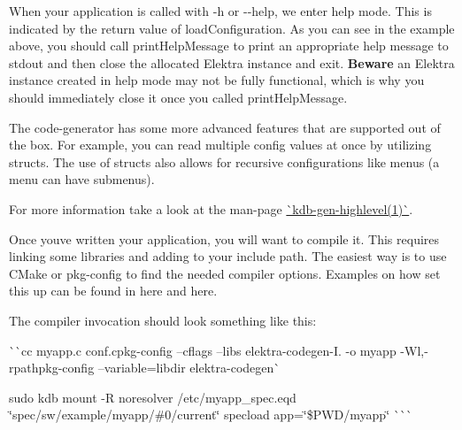 When your application is called with {\ttfamily -\/h} or {\ttfamily -\/-\/help}, we enter help mode. This is indicated by the return value {} of {\ttfamily load\+Configuration}. As you can see in the example above, you should call {\ttfamily print\+Help\+Message} to print an appropriate help message to {\ttfamily stdout} and then close the allocated {\ttfamily Elektra} instance and {\ttfamily exit}. {\bfseries{Beware}} an {\ttfamily Elektra} instance created in help mode may not be fully functional, which is why you should immediately close it once you called {\ttfamily print\+Help\+Message}.

The code-\/generator has some more advanced features that are supported out of the box. For example, you can read multiple config values at once by utilizing structs. The use of structs also allows for recursive configurations like menus (a menu can have submenus).

For more information take a look at the man-\/page \mbox{\hyperlink{doc_help_kdb-gen-highlevel_md}{\`{}kdb-\/gen-\/highlevel(1)\`{}}}.

Once you\textquotesingle{}ve written your application, you will want to compile it. This requires linking some libraries and adding to your include path. The easiest way is to use C\+Make or pkg-\/config to find the needed compiler options. Examples on how set this up can be found in here and here.

The compiler invocation should look something like this\+:

\`{}\`{}{\ttfamily  cc myapp.\+c conf.\+c}pkg-\/config --cflags --libs elektra-\/codegen{\ttfamily -\/I. -\/o myapp -\/Wl,-\/rpath}pkg-\/config --variable=libdir elektra-\/codegen\`{} 
\begin{DoxyCode}{0}
\DoxyCodeLine{}
\DoxyCodeLine{}
\DoxyCodeLine{}
\DoxyCodeLine{}
\DoxyCodeLine{}
\end{DoxyCode}
 sudo kdb mount -\/R noresolver /etc/myapp\+\_\+spec.eqd \char`\"{}spec/sw/example/myapp/\#0/current\char`\"{} specload app=\char`\"{}\$\+P\+W\+D/myapp\char`\"{} \`{}\`{}\`{}


